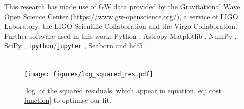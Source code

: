 \documentclass[linenumbers,twocolumn]{aastex631}
\begin{document}
This research has made use of GW data provided by the Gravitational Wave Open Science Center (\url{https://www.gw-openscience.org/}), a service of LIGO Laboratory, the LIGO Scientific Collaboration and the Virgo Collaboration. 
Further software used in this work: Python \citep{PythonReferenceManual},  Astropy \citep{astropy:2013,astropy:2018} Matplotlib \citep{2007CSE.....9...90H},  {NumPy} \citep{2020NumPy-Array}, SciPy \citep{2020SciPy-NMeth}, \texttt{ipython$/$jupyter} \citep{2007CSE.....9c..21P, Kluyver2016jupyter},  Seaborn \citep{waskom2020seaborn}  and  {hdf5}   \citep{collette_python_hdf5_2019}. 


\appendix


\section{ }

\begin{figure}[h]
\centering
{}
\texttt{[image: figures/log\_squared\_res.pdf]}
\caption{$\log$ of the squared residuals, which appear in equation \ref{eq: cost function} to optimise our fit. \label{fig: residuals}
  }
\end{figure}

\end{document}
